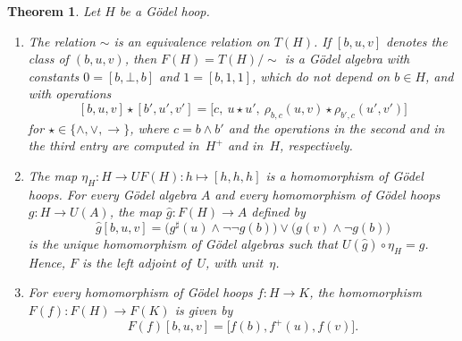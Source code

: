 \documentclass[reqno,a4paper]{amsart}
\theoremstyle{plain}
\newtheorem{theorem}[subsection]{Theorem}
\theoremstyle{definition}
\theoremstyle{remark}
\numberwithin{equation}{section}
\begin{document}
\begin{theorem}\label{ThmMain}
Let $H$ be a G\"odel hoop.
\begin{enumerate}
\item The relation $\sim$ is an equivalence relation on $T(H)$. If $[b,u,v]$ denotes the class of $(b,u,v)$, then $F(H)=T(H)/{\sim}$ is a G\"odel algebra with constants $0=[b,\bot,b]$ and $1=[b,1,1]$, which do not depend on $b\in H$, and with operations
\begin{equation}\label{EqOperations}
[b,u,v]\star[b',u',v']=\bigl[c,\ u\star u',\ \rho_{b,c}(u,v)\star\rho_{b',c}(u',v')\bigr]
\end{equation}
for $\star\in\{\wedge,\vee,\to\}$, where $c=b\wedge b'$ and the operations in the second and in the third entry are computed in~$H^+$ and in~$H$, respectively.
\item The map $\eta_H\colon H\to UF(H)\colon h\mapsto[h,h,h]$ is a homomorphism of G\"odel hoops. For every G\"odel algebra $A$ and every homomorphism of G\"odel hoops $g\colon H\to U(A)$, the map $\hat g\colon F(H)\to A$ defined by
\begin{equation}\label{EqHat}
\hat g[b,u,v]=\bigl(g^\sharp(u)\wedge\neg\neg g(b)\bigr)\vee\bigl(g(v)\wedge\neg g(b)\bigr)
\end{equation}
is the unique homomorphism of G\"odel algebras such that $U(\hat g)\circ\eta_H=g$. Hence, $F$ is the left adjoint of~$U$, with unit~$\eta$.
\item For every homomorphism of G\"odel hoops $f\colon H\to K$, the homomorphism $F(f)\colon F(H)\to F(K)$ is given by
\[
F(f)[b,u,v]=\bigl[f(b),f^+(u),f(v)\bigr].
\]
\end{enumerate}
\end{theorem}
\end{document}
